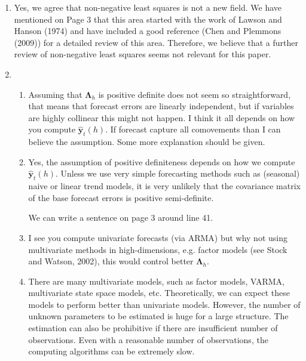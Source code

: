 \documentclass[10pt,a4paper]{article}
\begin{document}
\begin{enumerate}
\item [] {\color{blue} Yes, we agree that non-negative least squares is not a new field. We have mentioned on Page 3 that this area started with the work of Lawson and Hanson (1974) and have included a good reference (Chen and Plemmons (2009)) for a detailed review of this area. Therefore, we believe that a further review of non-negative least squares seems not relevant for this paper.}
\item \begin{enumerate}
	\item Assuming that $\bm{\Lambda}_h$ is positive definite does not seem so straightforward, that means that forecast errors are linearly independent, but if variables are highly collinear this might not happen. I think it all depends on how you compute $\hat{\bm{y}}_t(h)$. If forecast capture all comovements than I can believe the assumption. Some more explanation should be given.
	\item [] {\color{blue} Yes, the assumption of positive definiteness depends on how we compute $\hat{\bm{y}}_t(h)$. Unless we use very simple forecasting methods such as (seasonal) naive or linear trend models, it is very unlikely that the covariance matrix of the base forecast errors is positive semi-definite.}
	
	{\color{red} We can write a sentence on page 3 around line 41.}
	\item I see you compute univariate forecasts (via ARMA) but why not using multivariate methods in high-dimensions, e.g. factor models (see Stock and Watson, 2002), this would control better $\bm{\Lambda}_h$. 
	
	\item [] {\color{blue} There are many multivariate models, such as factor models, VARMA, multivariate state space models, etc. Theoretically, we can expect these models to perform better than univariate models. However, the number of unknown parameters to be estimated is huge for a large structure. The estimation can also be prohibitive if there are insufficient number of observations. Even with a reasonable number of observations, the computing algorithms can be extremely slow.\\
	
}
\end{enumerate}
\end{enumerate}
\end{document}
